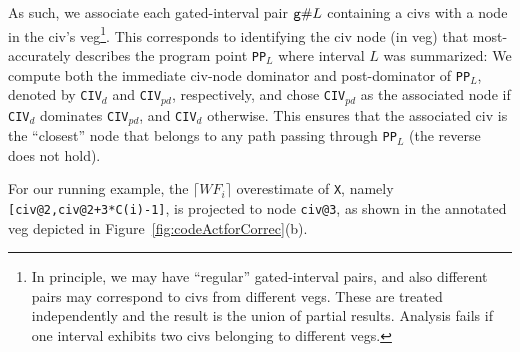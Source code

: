 \documentclass{sig-alternate}
\begin{document}
As such, we associate each gated-interval pair ${\tt g}\#L$ 
containing a {\sc civ}s with a node in the {\sc civ}'s {\sc veg}\footnote{  
In principle, we may have ``regular'' gated-interval pairs, and also 
different pairs may correspond to {\sc civ}s from different {\sc veg}s. 
These are treated independently and the result is the union of partial results.
Analysis fails if one interval exhibits two {\sc civ}s belonging
to different {\sc veg}s.}. 
This corresponds to identifying the {\sc civ} node (in {\sc veg})
that most-accurately describes the program point {\tt PP$_L$} 
where interval $L$ was summarized:
%
%
We compute both the immediate {\sc civ}-node dominator and 
post-dominator of {\tt PP$_L$}, denoted by {\tt CIV}$_{d}$ and 
{\tt CIV}$_{pd}$, respectively, and chose {\tt CIV}$_{pd}$
as the associated node if {\tt CIV}$_{d}$ dominates {\tt CIV}$_{pd}$, 
and {\tt CIV}$_{d}$ otherwise. This ensures that the associated {\sc civ}
is the ``closest'' node that belongs to any path passing through {\tt PP$_L$}
(the reverse does not hold).

For our running example, the $\lceil WF_i\rceil$ overestimate of {\tt X}, 
namely {\tt [civ@2,civ@2+3*C(i)-1]}, is projected to node {\tt civ@3}, 
as shown in the annotated {\sc veg} depicted in Figure~\ref{fig:codeActforCorrec}(b).
%
\end{document}
